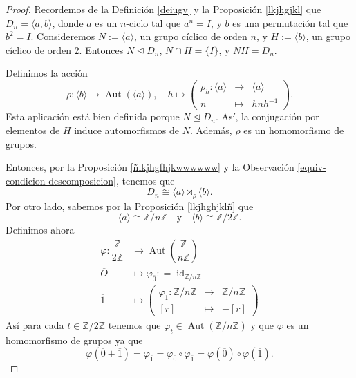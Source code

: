 \begin{proof}
	Recordemos de la Definición \ref{deiugv} y la Proposición \ref{lkjhgjkl} que  \(D_n=\langle a,b\rangle\), donde \(a\) es un \(n\)-ciclo tal que \(a^n=I\), y \(b\) es una permutación tal que \(b^2=I\). Consideremos \(N:=\langle a\rangle\), un grupo cíclico de orden \(n\), y \(H:=\langle b\rangle\), un grupo cíclico de orden \(2\). Entonces \(N\trianglelefteq D_n\), \(N\cap H = \{I\}\), y \(NH = D_n\).
	
	\medskip
	\noindent Definimos la acción
	\[
	\rho: \langle b \rangle \longrightarrow \operatorname{Aut}(\langle a\rangle), \quad h \longmapsto \left(  
	\begin{array}{rcl}
		\rho_h : \langle a\rangle &\to& \langle a\rangle \\
		n &\mapsto& hnh^{-1}
	\end{array} \right).
	\]
	Esta aplicación está bien definida porque \(N \trianglelefteq D_n\). Así, la conjugación por elementos de \(H\) induce automorfismos de \(N\). Además, \(\rho\) es un homomorfismo de grupos.
	
	\medskip
	\noindent
	Entonces, por la Proposición \ref{ñlkjhgfhjkwwwwww} y la Observación \ref{equiv-condicion-descomposicion}, tenemos que
	\[
	D_n \cong \langle a\rangle\rtimes_{\rho} \langle b \rangle.
	\]
	Por otro lado, sabemos por la Proposición \ref{lkjhghjklñ} que
	\[
	\langle a\rangle \cong \mathbb{Z}/n\mathbb{Z} \quad \text{y} \quad \langle b\rangle \cong \mathbb{Z}/2\mathbb{Z}.
	\]
	Definimos ahora 	
	\begin{align*}
		\varphi: \dfrac{\mathbb{Z}}{2\mathbb{Z}} &\longrightarrow  \operatorname{Aut}\left(\dfrac{\mathbb{Z}}{n\mathbb{Z}}\right)\\[5pt]
		\overline{O}& \longmapsto \varphi_{\overline{0}}: =\operatorname{id}_{\mathbb{Z}/n\mathbb{Z}}\\[5pt]
		\overline{1}& \longmapsto  \left(  
		\begin{array}{rcl}
			\varphi_{\overline{1}} : \mathbb{Z}/n\mathbb{Z} &\to&\mathbb{Z}/n\mathbb{Z} \\[2pt]
			[r] &\mapsto& -[r]
		\end{array} \right)
	\end{align*}
	Así para cada $t \in \mathbb{Z}/2\mathbb{Z}$ tenemos que $\varphi_t\in \operatorname{Aut}\left(\mathbb{Z}/n\mathbb{Z}\right)$ y que $\varphi$ es un homomorfismo de grupos ya que $$\varphi(\overline{0}+\overline{1})=\varphi_{\overline{1}}=\varphi_{\overline{0}}\circ\varphi_{\overline{1}}=\varphi\left(\overline{0}\right)\circ \varphi\left(\overline{1}\right).$$
	

\end{proof}
